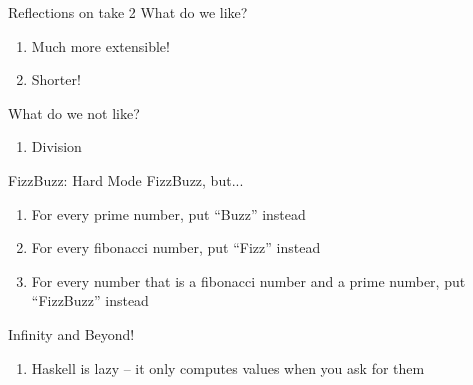 \documentclass{beamer}
\begin{document}
\begin{frame}{Reflections on take 2}
  What do we like?
  \pause
  \begin{enumerate}
    \item Much more extensible!
    \pause
    \item Shorter!
  \end{enumerate}
  \pause
  What do we not like?
  \begin{enumerate}
    \pause
    \item Division
  \end{enumerate}
\end{frame}

\begin{frame}{FizzBuzz: Hard Mode}
  FizzBuzz, but...
  \begin{enumerate}
    \pause
    \item For every prime number, put ``Buzz'' instead
    \pause
    \item For every fibonacci number, put ``Fizz'' instead
    \pause
    \item For every number that is a fibonacci number and a prime number, put ``FizzBuzz'' instead
  \end{enumerate}
\end{frame}


\begin{frame}{Infinity and Beyond!}
 \infiniteLists
 \pause
 \begin{enumerate}
   \item Haskell is lazy -- it only computes values when you ask for them
 \end{enumerate}
\end{frame}

\end{document}
